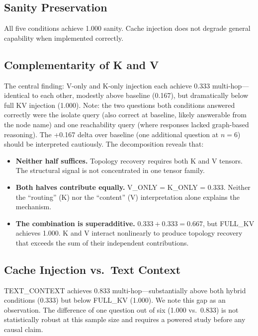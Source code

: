 \documentclass[11pt,a4paper]{article}
\begin{document}
\subsection{Sanity Preservation}

All five conditions achieve 1.000 sanity. Cache injection does not degrade general capability when implemented correctly.

\subsection{Complementarity of K and V}

The central finding: V-only and K-only injection each achieve 0.333 multi-hop---identical to each other, modestly above baseline (0.167), but dramatically below full KV injection (1.000). Note: the two questions both conditions answered correctly were the isolate query (also correct at baseline, likely answerable from the node name) and one reachability query (where responses lacked graph-based reasoning). The +0.167 delta over baseline (one additional question at $n{=}6$) should be interpreted cautiously. The decomposition reveals that:

\begin{itemize}
    \item \textbf{Neither half suffices.} Topology recovery requires both K and V tensors. The structural signal is not concentrated in one tensor family.
    \item \textbf{Both halves contribute equally.} V\_ONLY = K\_ONLY = 0.333. Neither the ``routing'' (K) nor the ``content'' (V) interpretation alone explains the mechanism.
    \item \textbf{The combination is superadditive.} $0.333 + 0.333 = 0.667$, but FULL\_KV achieves 1.000. K and V interact nonlinearly to produce topology recovery that exceeds the sum of their independent contributions.
\end{itemize}

\subsection{Cache Injection vs.\ Text Context}

TEXT\_CONTEXT achieves 0.833 multi-hop---substantially above both hybrid conditions (0.333) but below FULL\_KV (1.000). We note this gap as an observation. The difference of one question out of six (1.000 vs.\ 0.833) is not statistically robust at this sample size and requires a powered study before any causal claim.
\end{document}

